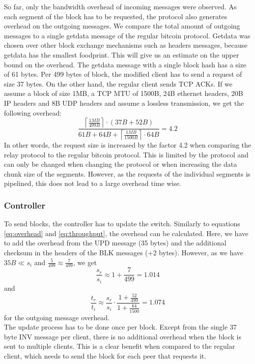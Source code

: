 So far, only the bandwidth overhead of incoming messages were observed. As each segment of the block has to be requested, the protocol also generates overhead on the outgoing messages. We compare the total amount of outgoing messages to a single getdata message of the regular bitcoin protocol. Getdata was chosen over other block exchange mechanisms such as headers messages, because getdata has the smallest foodprint. This will give us an estimate on the upper bound on the overhead. The getdata message with a single block hash has a size of 61 bytes. Per 499 bytes of block, the modified client has to send a request of size 37 bytes. On the other hand, the regular client sends TCP ACKs. If we assume a block of size 1MB, a TCP MTU of 1500B, 24B ethernet headers, 20B IP headers and 8B UDP headers and assume a lossless transmission, we get the following overhead:
\begin{equation}
	\frac{\left\lceil \frac{1MB}{499B} \right\rceil \cdot (37B + 52B)}{61B + 64B + \left\lceil \frac{1MB}{1500B} \right\rceil\cdot 64B} = 4.2
\end{equation}
In other words, the request size is increased by the factor 4.2 when comparing the relay protocol to the regular bitcoin protocol. This is limited by the protocol and can only be changed when changing the protocol or when increasing the data chunk size of the segments. However, as the requests of the individual segments is pipelined, this does not lead to a large overhead time wise. 



\subsubsection{Controller}
To send blocks, the controller has to update the switch. Similarly to equations \ref{eq:overhead} and \ref{eq:throughput}, the overhead can be calculated. Here, we have to add the overhead from the UPD message (35 bytes) and the additional checksum in the headers of the BLK messages (+2 bytes). However, as we have $35B \ll s_i$ and $\frac{5}{499}\approx\frac{7}{499}$, we get
\begin{equation}
	\frac{s_r}{s_i} \approx 1+\frac{7}{499} = 1.014
\end{equation}
and 
\begin{equation} \label{eq:throughput}
	\frac{t_r}{t_i}\approx \frac{s_r}{s_i} \cdot\frac{1+\frac{52}{499}}{1+\frac{64}{1500}} = 1.074
\end{equation}
for the outgoing message overhead.\\
The update process has to be done once per block. Except from the single 37 byte INV message per client, there is no additional overhead when the block is sent to multiple clients. This is a clear benefit when compared to the regular client, which needs to send the block for each peer that requests it.





















